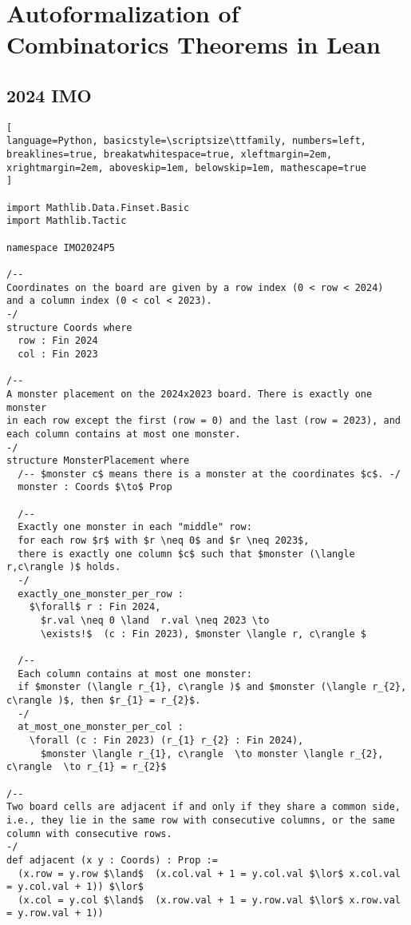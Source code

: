 \section{Autoformalization of Combinatorics Theorems in Lean}
\label{appendix:J}


\subsection*{2024 IMO}
\begin{tcolorbox}[enhanced, breakable, rounded corners,
    colback=green!5!white, colframe=green!75!black,
    colbacktitle=green!85!black, fonttitle=\bfseries, coltitle=white, title=Autoformalization for 2024 IMO Problem 5]
\setlength{\parskip}{1em}
\begin{lstlisting}[
language=Python, basicstyle=\scriptsize\ttfamily, numbers=left, breaklines=true, breakatwhitespace=true, xleftmargin=2em, xrightmargin=2em, aboveskip=1em, belowskip=1em, mathescape=true
]

import Mathlib.Data.Finset.Basic
import Mathlib.Tactic

namespace IMO2024P5

/--
Coordinates on the board are given by a row index (0 < row < 2024)
and a column index (0 < col < 2023).
-/
structure Coords where
  row : Fin 2024
  col : Fin 2023

/--
A monster placement on the 2024x2023 board. There is exactly one monster
in each row except the first (row = 0) and the last (row = 2023), and
each column contains at most one monster.
-/
structure MonsterPlacement where
  /-- $monster c$ means there is a monster at the coordinates $c$. -/
  monster : Coords $\to$ Prop

  /--
  Exactly one monster in each "middle" row:
  for each row $r$ with $r \neq 0$ and $r \neq 2023$,
  there is exactly one column $c$ such that $monster (\langle r,c\rangle )$ holds.
  -/
  exactly_one_monster_per_row :
    $\forall$ r : Fin 2024,
      $r.val \neq 0 \land  r.val \neq 2023 \to
      \exists!$  (c : Fin 2023), $monster \langle r, c\rangle $

  /--
  Each column contains at most one monster:
  if $monster (\langle r_{1}, c\rangle )$ and $monster (\langle r_{2}, c\rangle )$, then $r_{1} = r_{2}$.
  -/
  at_most_one_monster_per_col :
    \forall (c : Fin 2023) (r_{1} r_{2} : Fin 2024),
      $monster \langle r_{1}, c\rangle  \to monster \langle r_{2}, c\rangle  \to r_{1} = r_{2}$

/--
Two board cells are adjacent if and only if they share a common side,
i.e., they lie in the same row with consecutive columns, or the same
column with consecutive rows.
-/
def adjacent (x y : Coords) : Prop :=
  (x.row = y.row $\land$  (x.col.val + 1 = y.col.val $\lor$ x.col.val = y.col.val + 1)) $\lor$
  (x.col = y.col $\land$  (x.row.val + 1 = y.row.val $\lor$ x.row.val = y.row.val + 1))


\end{lstlisting}
\end{tcolorbox}
